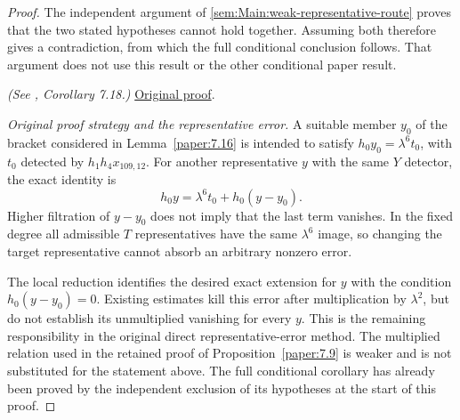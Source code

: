 \begin{proof}
The independent argument of \ref{sem:Main:weak-representative-route} proves that the two stated hypotheses cannot hold together. Assuming both therefore gives a contradiction, from which the full conditional conclusion follows. That argument does not use this result or the other conditional paper result.

\textit{(See \cite{LWX126}, Corollary 7.18.)} \href{paper/main.tex.html#L2577}{Original proof}.

\textit{Original proof strategy and the representative error.} A suitable member $y_0$ of the bracket considered in Lemma~\ref{paper:7.16} is intended to satisfy $h_0y_0=\lambda^6t_0$, with $t_0$ detected by $h_1h_4x_{109,12}$. For another representative $y$ with the same $Y$ detector, the exact identity is
\[
 h_0y=\lambda^6t_0+h_0(y-y_0).
\]
Higher filtration of $y-y_0$ does not imply that the last term vanishes. In the fixed degree all admissible $T$ representatives have the same $\lambda^6$ image, so changing the target representative cannot absorb an arbitrary nonzero error.

The local reduction identifies the desired exact extension for $y$ with the condition $h_0(y-y_0)=0$. Existing estimates kill this error after multiplication by $\lambda^2$, but do not establish its unmultiplied vanishing for every $y$. This is the remaining responsibility in the original direct representative-error method. The multiplied relation used in the retained proof of Proposition~\ref{paper:7.9} is weaker and is not substituted for the statement above. The full conditional corollary has already been proved by the independent exclusion of its hypotheses at the start of this proof.
\end{proof}

